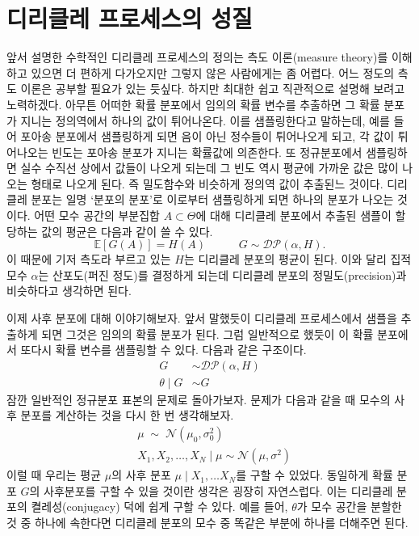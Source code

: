 \documentclass[a4paper, 10pt]{book}
\begin{document}
\section{디리클레 프로세스의 성질}
  앞서 설명한 수학적인 디리클레 프로세스의 정의는 측도 이론(measure theory)를 이해하고 있으면 더 편하게 다가오지만 그렇지 않은 사람에게는 좀 어렵다. 어느 정도의 측도 이론은 공부할 필요가 있는 듯싶다. 하지만 최대한 쉽고 직관적으로 설명해 보려고 노력하겠다. 아무튼 어떠한 확률 분포에서 임의의 확률 변수를 추출하면 그 확률 분포가 지니는 정의역에서 하나의 값이 튀어나온다. 이를 샘플링한다고 말하는데, 예를 들어 포아송 분포에서 샘플링하게 되면 음이 아닌 정수들이 튀어나오게 되고, 각 값이 튀어나오는 빈도는 포아송 분포가 지니는 확률값에 의존한다. 또 정규분포에서 샘플링하면 실수 수직선 상에서 값들이 나오게 되는데 그 빈도 역시 평균에 가까운 값은 많이 나오는 형태로 나오게 된다. 즉 밀도함수와 비슷하게 정의역 값이 추출된느 것이다. 디리클레 분포는 일명 `분포의 분포'로 이로부터 샘플링하게 되면 하나의 분포가 나오는 것이다. 어떤 모수 공간의 부분집합 $A \subset \Theta$에 대해 디리클레 분포에서 추출된 샘플이 할당하는 값의 평균은 다음과 같이 쓸 수 있다.
  $$
  \mathbb{E}\left[G\left(A\right)\right]=H\left(A\right) \hspace{35pt} G\sim \mathcal{DP}\left(\alpha, H\right).
  $$
  이 때문에 기저 측도라 부르고 있는 $H$는 디리클레 분포의 평균이 된다. 이와 달리 집적 모수 $\alpha$는 산포도(퍼진 정도)를 결정하게 되는데 디리클레 분포의 정밀도(precision)과 비슷하다고 생각하면 된다. \par
  이제 사후 분포에 대해 이야기해보자. 앞서 말했듯이 디리클레 프로세스에서 샘플을 추출하게 되면 그것은 임의의 확률 분포가 된다. 그럼 일반적으로 했듯이 이 확률 분포에서 또다시 확률 변수를 샘플링할 수 있다. 다음과 같은 구조이다.
  \begin{align*}
    G &\sim \mathcal{DP}\left(\alpha, H\right)\\
    \theta\;|\; G &\sim G
  \end{align*}
  잠깐 일반적인 정규분포 표본의 문제로 돌아가보자. 문제가 다음과 같을 때 모수의 사후 분포를 계산하는 것을 다시 한 번 생각해보자.
  \begin{align*}
    &\mu \;\sim\; \mathcal{N}\left(\mu_{0},\sigma_{0}^{2}\right)\\
    &X_{1},X_{2},\ldots , X_{N}\;|\;\mu \sim \mathcal{N}\left(\mu,\sigma^{2}\right)
  \end{align*}
  이럴 때 우리는 평균 $\mu$의 사후 분포 $\mu\;|\;X_{1},\ldots X_{N}$를 구할 수 있었다. 동일하게 확률 분포 $G$의 사후분포를 구할 수 있을 것이란 생각은 굉장히 자연스럽다. 이는 디리클레 분포의 켤레성(conjugacy) 덕에 쉽게 구할 수 있다. 예를 들어, $\theta$가 모수 공간을 분할한 것 중 하나에 속한다면 디리클레 분포의 모수 중 똑같은 부분에 하나를 더해주면 된다.
\end{document}
